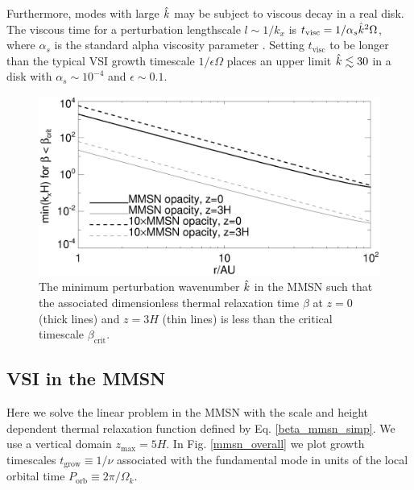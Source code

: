 Furthermore, modes with large $\hat{k}$ may be subject to viscous decay
in a real disk. The viscous time for a perturbation lengthscale
$l\sim 1/k_x$ is $t_\mathrm{visc} = 1/\alpha_s\hat{k}^2\Omega $, where
$\alpha_s$ is the standard alpha viscosity parameter
\citep{shakura73}. Setting $t_\mathrm{visc}$ to be longer than the
typical VSI growth timescale $1/\epsilon\Omega$ places an upper limit
$\hat{k} \lesssim 30$ in a disk with $\alpha_s\sim 10^{-4}$ and
$\epsilon \sim 0.1$.    



\begin{figure}
  \includegraphics[width=\linewidth]{figures/bcrit_mink} 
  \caption{The minimum perturbation wavenumber $\hat{k}$ in
    the MMSN such that the associated dimensionless thermal
    relaxation time  $\beta$ at $z=0$ (thick lines) and $z=3H$ (thin
    lines) is less than the critical timescale $\beta_\mathrm{crit}$.  
    \label{mmsn_bcrit_bcool_mink}}   
\end{figure}  


\subsection{VSI in the MMSN}
Here we solve the linear problem in the MMSN with the scale and
height dependent thermal relaxation function defined by
Eq. \ref{beta_mmsn_simp}.  We use a vertical
domain $z_\mathrm{max}=5H$. In Fig. \ref{mmsn_overall} we plot growth
timescales $t_\mathrm{grow} \equiv 1/\nu$ associated with the
fundamental mode in units of the local orbital time
$P_\mathrm{orb}\equiv 2\pi/\Omega_k$.    

